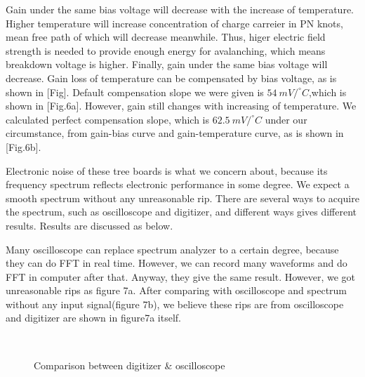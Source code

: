 \documentclass[11pt,a4paper]{article}
\begin{document}
Gain under the same bias voltage will decrease with the increase of temperature. Higher temperature will increase concentration of charge carreier in PN knots, mean free path of which will decrease meanwhile. Thus, higer electric field strength is needed to provide enough energy for avalanching, which means breakdown voltage is higher. Finally, gain under the same bias voltage will decrease. Gain loss of temperature can be compensated by bias voltage, as is shown in [Fig].
Default compensation slope we were given is $54~mV/^{\circ}C$,which is shown in [Fig.6a]. However, gain still changes with increasing of temperature. We calculated perfect compensation slope, which is $62.5~mV/^{\circ}C$ under our circumstance, from gain-bias curve and gain-temperature curve, as is shown in [Fig.6b].

Electronic noise of these tree boards is what we concern about, because its frequency spectrum reflects electronic performance in some degree. We expect a smooth spectrum without any unreasonable rip. There are several ways to acquire the spectrum, such as oscilloscope and digitizer, and different ways gives different results. Results are discussed as below.

Many oscilloscope can replace spectrum analyzer to a certain degree, because they can do FFT in real time. However, we can record many waveforms and do FFT in computer after that. Anyway, they give the same result. However, we got unreasonable rips as figure 7a. After comparing with oscilloscope and spectrum without any input signal(figure 7b), we believe these rips are from oscilloscope and digitizer are shown in figure7a itself.

\begin{figure}[ht]
    \centering
    \hspace{20pt}
    \
    \caption{Comparison between digitizer \& oscilloscope}\label{fig:noise}
\end{figure}
\end{document}
